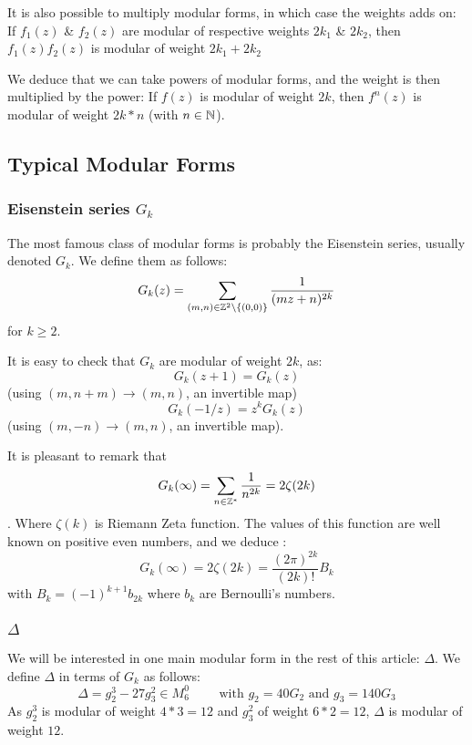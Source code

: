 It is also possible to multiply modular forms, in which case the weights adds on:
If $f_1(z)$ \& $f_2(z)$ are modular of respective weights $2k_1$ \& $2k_2$, then $f_1(z)f_2(z)$ is modular of weight $2k_1+2k_2$ 

We deduce that we can take powers of modular forms, and the weight is then multiplied by the power:
If $f(z)$ is modular of weight $2k$, then $f^n(z)$ is modular of weight $2k*n$ (with $n \in \mathbb{N}$).



\subsection{Typical Modular Forms}
\subsubsection{Eisenstein series $G_k$}
The most famous class of modular forms is probably the Eisenstein series, usually denoted $G_k$. We define them as follows\cite[Examples of Modular Forms of Level 1]{ModularFormsComputationalApproach}:
$$
G_k(z) = \sum_{(m,n) \in \mathbb{Z}^2\setminus\{(0,0)\}} \frac{1}{(mz+n)^{2k}}
$$
for $k \geq 2$.

It is easy to check that $G_k$ are modular of weight $2k$\cite[Proposition 2.1]{ModularFormsComputationalApproach}, as:
$$
G_k(z+1) = G_k(z)
$$
(using $(m,n+m) \to (m,n)$, an invertible map)
$$
G_k(-1/z) = z^k G_k(z)
$$
(using $(m,-n) \to (m,n)$, an invertible map).

It is pleasant to remark that \cite[Proposition 2.2]{ModularFormsComputationalApproach}
$$
G_k(\infty) = \sum_{n \in \mathbb{Z}^*} \frac{1}{n^{2k}} = 2\zeta(2k)
$$.
Where $\zeta(k)$ is Riemann Zeta function.
The values of this function are well known on positive even numbers, and we deduce \cite[p.194]{MathHandbook}:
$$
G_k(\infty) = 2\zeta(2k) = \frac{(2\pi)^{2k}}{(2k)!}B_k
$$
with $B_k = (-1)^{k+1} b_{2k}$ where $b_k$ are Bernoulli's numbers.

\subsubsection{$\varDelta$}
We will be interested in one main modular form in the rest of this article: $\varDelta$.
We define $\varDelta$ in terms of $G_k$ as follows\cite[p.84]{CourseInArithmetic}:
$$
\varDelta = g_2^3 - 27g_3^2 \in M_6^0 \qquad \text{ with } g_2 = 40G_2 \text{ and } g_3 = 140G_3
$$
As $g_2^3$ is modular of weight $4*3=12$ and $g_3^2$ of weight $6*2=12$, $\varDelta$ is modular of weight $12$.

